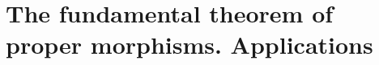 \section{The fundamental theorem of proper morphisms. Applications}
\label{section-cohomological-study-of-projective-morphisms}


